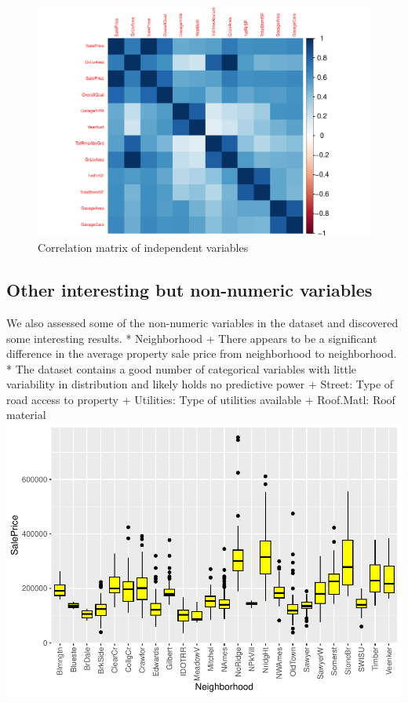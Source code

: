 \documentclass[aoas]{imsart}
\numberwithin{equation}{section}
\theoremstyle{plain}
\theoremstyle{remark}
\begin{document}
\begin{figure}
\centering
\includegraphics{STAT-444-FINAL-PROJECT-PROPOSAL_files/figure-latex/unnamed-chunk-8-1.pdf}
\caption{Correlation matrix of independent variables\label{}}
\end{figure}

\hypertarget{other-interesting-but-non-numeric-variables}{%
\subsection{Other interesting but non-numeric
variables}\label{other-interesting-but-non-numeric-variables}}

We also assessed some of the non-numeric variables in the dataset and
discovered some interesting results. * Neighborhood + There appears to
be a significant difference in the average property sale price from
neighborhood to neighborhood. * The dataset contains a good number of
categorical variables with little variability in distribution and likely
holds no predictive power + Street: Type of road access to property +
Utilities: Type of utilities available + Roof.Matl: Roof material
\includegraphics{STAT-444-FINAL-PROJECT-PROPOSAL_files/figure-latex/unnamed-chunk-9-1.pdf}
\end{document}
